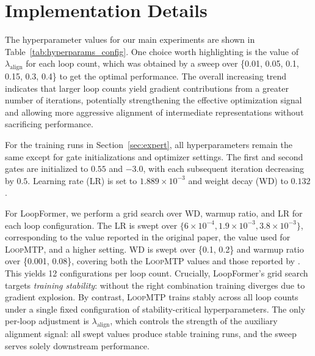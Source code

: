 \section{Implementation Details}
\label{sec:appendix:implementation_details}


The hyperparameter values for our main experiments are shown in Table~\ref{tab:hyperparams_config}. One choice worth highlighting is the value of $\lambda_{\text{align}}$ for each loop count, which was obtained by a sweep over \{0.01, 0.05, 0.1, 0.15, 0.3, 0.4\} to get the optimal performance. The overall increasing trend indicates that larger loop counts yield gradient contributions from a greater number of iterations, potentially strengthening the effective optimization signal and allowing more aggressive alignment of intermediate representations without sacrificing performance. 

For the training runs in Section~\ref{sec:expert}, all hyperparameters remain the same except for gate initializations and optimizer settings. The first and second gates are initialized to $0.55$ and $-3.0$, with each subsequent iteration decreasing by $0.5$. Learning rate (LR) is set to $1.889{\times}10^{-3}$ and weight decay (WD) to $0.132$. 

For LoopFormer, we perform a grid search over WD, warmup ratio, and LR for each loop configuration. The LR is swept over $\{6{\times}10^{-4}, 1.9{\times}10^{-3}, 3.8{\times}10^{-3}\}$, corresponding to the value reported in the original paper, the value used for \textsc{LoopMTP}, and a higher setting. WD is swept over \{0.1, 0.2\} and warmup ratio over \{0.001, 0.08\}, covering both the \textsc{LoopMTP} values and those reported by \citet{jeddi2026loopformer}. This yields 12 configurations per loop count.
Crucially, LoopFormer's grid search targets \emph{training stability}:
without the right combination
training diverges due to gradient explosion. By contrast, \textsc{LoopMTP}
trains stably across all loop counts under a single fixed
configuration of stability-critical hyperparameters. The only
per-loop adjustment is $\lambda_{\text{align}}$, which controls the
strength of the auxiliary alignment signal: all swept values produce
stable training runs, and the sweep serves solely
downstream performance. 








